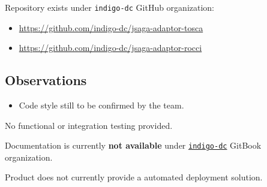 \documentclass[a4wide,11pt]{article}
\begin{document}


\label{sec:repository}
Repository exists under \texttt{indigo-dc} GitHub organization:
    \begin{itemize}
        \item \url{https://github.com/indigo-dc/jsaga-adaptor-tosca}\
        \item \url{https://github.com/indigo-dc/jsaga-adaptor-rocci}\
        \end{itemize}



\label{sec:code_style}


\subsection{Observations}
\begin{itemize}
        \item Code style still to be confirmed by the team.
    \end{itemize}

 
 

\label{sec:unit_test}





\label{sec:func_int_test}

    No functional or integration testing provided.
    
    



\label{sec:gitbook}
Documentation is currently \textbf{not available} under \href{https://www.gitbook.com/@indigo-dc/dashboard}{\texttt{indigo-dc}} GitBook organization.



\label{sec:configuration}


Product does not currently provide a automated deployment solution.



\newpage

\end{document}
